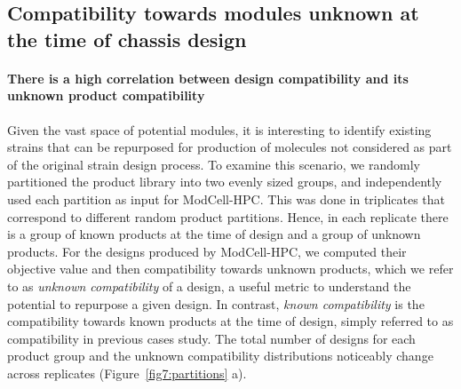 {%



\subsection{Compatibility towards modules unknown at the time of chassis design}

\paragraph{There is a high correlation between design compatibility and its unknown product compatibility}
Given the vast space of potential modules, it is interesting to identify existing strains that can be repurposed for production of molecules not considered as part of the original strain design process.
To examine this scenario,  we randomly partitioned the product library into two evenly sized groups, and independently used each partition as input for ModCell-HPC.
This was done in triplicates that correspond to different random product partitions.
Hence, in each replicate there is a group of known products at the time of design and a group of unknown products. For the designs produced by ModCell-HPC, we computed their objective value and then compatibility towards unknown products, which we refer to as \emph{unknown compatibility} of a design, a useful metric to understand the potential to repurpose a given design.
In contrast, \emph{known compatibility} is the compatibility towards known products at the time of design, simply referred to as compatibility in previous cases study.
The total number of designs for each product group and the unknown compatibility distributions noticeably change across replicates (Figure~\ref{fig7:partitions} a).
}
